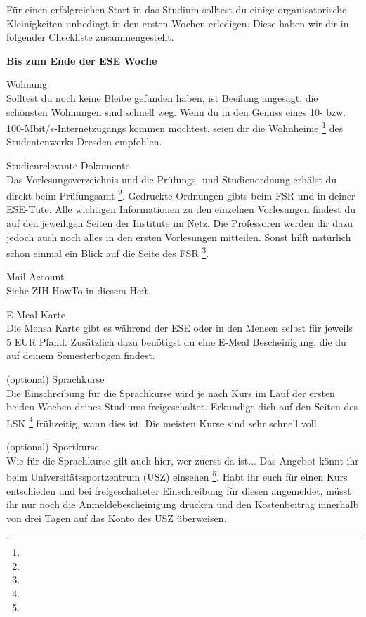
Für einen erfolgreichen Start in das Studium solltest du einige organisatorische Kleinigkeiten unbedingt in den ersten Wochen erledigen.
Diese haben wir dir in folgender Checkliste zusammengestellt.

\textbf{Bis zum Ende der ESE Woche}

Wohnung \\
Solltest du noch keine Bleibe gefunden haben, ist Beeilung angesagt, die schönsten Wohnungen sind schnell weg.
Wenn du in den Genuss eines 10- bzw. 100-Mbit/s-Internetzugangs kommen möchtest, seien dir die Wohnheime \footnote{} des Studentenwerks Dresden empfohlen.

Studienrelevante Dokumente \\
Das Vorlesungsverzeichnis und die Prüfungs- und Studienordnung erhälst du direkt beim Prüfungsamt \footnote{}.
Gedruckte Ordnungen gibts beim FSR und in deiner ESE-Tüte.
Alle wichtigen Informationen zu den einzelnen Vorlesungen findest du auf den jeweiligen Seiten der Institute im Netz.
Die Professoren werden dir dazu jedoch auch noch alles in den ersten Vorlesungen mitteilen. Sonst hilft natürlich schon einmal ein Blick auf die Seite des FSR \footnote{}.

Mail Account \\
Siehe ZIH HowTo in diesem Heft.

E-Meal Karte \\
Die Mensa Karte gibt es während der ESE oder in den Mensen selbst für jeweils 5 EUR Pfand.
Zusätzlich dazu benötigst du eine E-Meal Bescheinigung, die du auf deinem Semesterbogen findest.

(optional) Sprachkurse \\
Die Einschreibung für die Sprachkurse wird je nach Kurs im Lauf der ersten beiden Wochen deines Studiums freigeschaltet.
Erkundige dich auf den Seiten des LSK \footnote{} frühzeitig, wann dies ist. Die meisten Kurse sind sehr schnell voll.

(optional) Sportkurse \\
Wie für die Sprachkurse gilt auch hier, wer zuerst da ist...
Das Angebot könnt ihr beim Universitätssportzentrum (USZ) einsehen \footnote{}.
Habt ihr euch für einen Kurs entschieden und bei freigeschalteter Einschreibung für diesen angemeldet, müsst ihr nur noch die Anmeldebescheinigung drucken und den Kostenbeitrag innerhalb von drei Tagen auf das Konto des USZ überweisen.

